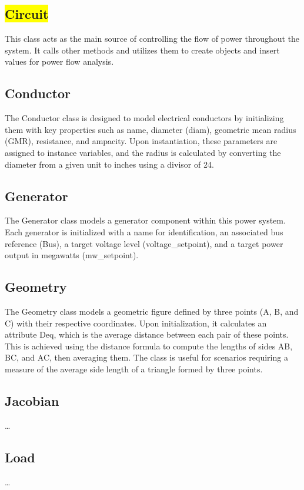 \documentclass{article}
\begin{document}
	\subsection{\colorbox{yellow}{Circuit}}
	This class acts as the main source of controlling the flow of power throughout the system. It calls other methods and utilizes them to create objects and insert values for power flow analysis.
	
	\subsection{Conductor}
	The Conductor class is designed to model electrical conductors by initializing them with key properties such as name, diameter (diam), geometric mean radius (GMR), resistance, and ampacity. Upon instantiation, these parameters are assigned to instance variables, and the radius is calculated by converting the diameter from a given unit to inches using a divisor of 24.
	
	\subsection{Generator}
	The Generator class models a generator component within this  power system. Each generator is initialized with a name for identification, an associated bus reference (Bus), a target voltage level (voltage\_setpoint), and a target power output in megawatts (mw\_setpoint).
	
	\subsection{Geometry}
	The Geometry class models a geometric figure defined by three points (A, B, and C) with their respective coordinates. Upon initialization, it calculates an attribute Deq, which is the average distance between each pair of these points. This is achieved using the distance formula to compute the lengths of sides AB, BC, and AC, then averaging them. The class is useful for scenarios requiring a measure of the average side length of a triangle formed by three points.
	
	\subsection{Jacobian}
	\dots
	
	\subsection{Load}
	\dots
	
\end{document}

